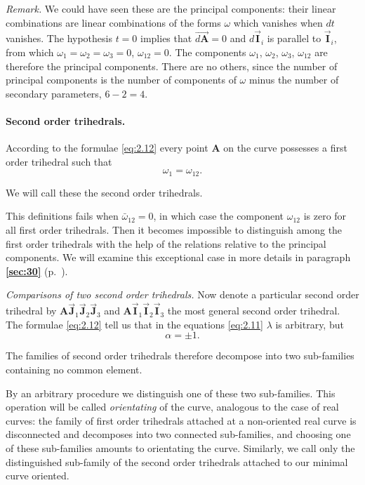 \documentclass[leqno,11pt]{book}
\numberwithin{equation}{chapter}
\theoremstyle{shape1}
\theoremstyle{shapesmall}
\newcommand{\fsref}[1]{{\rm\textsection\textbf{\ref{sec:#1}}}}
\newcommand{\rvec}[1]{\vec{\mathbf{#1}}}
\newcommand{\ivec}{\rvec{I}}
\newcommand{\jvec}{\rvec{J}}
\newcommand{\somespace}{\vspace{9pt}}
\begin{document}
\emph{Remark.} We could have seen these are the principal components: their linear combinations are linear combinations of the forms $\omega$ which vanishes when $dt$ vanishes. The hypothesis $t=0$ implies that $\overrightarrow{d\mathbf{A}}=0$ and $d\ivec_{i}$ is parallel to $\ivec_{i}$, from which $\omega_{1}=\omega_{2}=\omega_{3}=0$, $\omega_{12}=0$. The components $\omega_{1}$, $\omega_{2}$, $\omega_{3}$, $\omega_{12}$ are therefore the principal components. There are no others, since the number of principal components is the number of components of $\omega$ minus the number of secondary parameters, $6-2=4$.

\paragraph{Second order trihedrals.}
\label{sec:28}
According to the formulae \eqref{eq:2.12} every point $\mathbf{A}$ on the curve possesses a first order trihedral such that
\begin{equation}
  \label{eq:2.13}
  \omega_{1}=\omega_{12}.
\end{equation}

We will call these the second order trihedrals.

This definitions fails when $\bar\omega_{12}=0$, in which case the component $\omega_{12}$ is zero for all first order trihedrals. Then it becomes impossible to distinguish among the first order trihedrals with the help of the relations relative to the principal components. We will examine this exceptional case in more details in paragraph \fsref{30} (p.~\pageref{sec:30}).

\somespace

\emph{Comparisons of two second order trihedrals.} Now denote a particular second order trihedral by $\mathbf{A}\jvec_{1}\jvec_{2}\jvec_{3}$ and $\mathbf{A}\ivec_{1}\ivec_{2}\ivec_{3}$ the most general second order trihedral. The formulae \eqref{eq:2.12} tell us that in the equations \eqref{eq:2.11} $\lambda$ is arbitrary, but
\begin{equation}
  \label{eq:2.14}
  \alpha=\pm1.
\end{equation}

The families of second order trihedrals therefore decompose into two sub-families containing no common element.

By an arbitrary procedure we distinguish one of these two sub-families. This operation will be called \emph{orientating} of the curve, analogous to the case of real curves: the family of first order trihedrals attached at a non-oriented real curve is disconnected and decomposes into two connected sub-families, and choosing one of these sub-families amounts to orientating the curve. Similarly, we call only the distinguished sub-family of the second order trihedrals attached to our minimal curve oriented.
\end{document}
